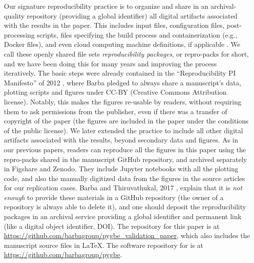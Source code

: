 Our signature reproducibility practice is to organize and share in an archival-quality repository (providing a global identifier) all digital artifacts associated with the results in the paper. 
This includes input files, configuration files, post-processing scripts, files specifying the build process and containerization (e.g., Docker files), and even cloud computing machine definitions, if applicable \cite{mesnard-barba2019}.
We call these openly shared file sets \emph{reproducibility packages}, or repro-packs for short, and we have been doing this for many years and improving the process iteratively. 
The basic steps were already contained in the ``Reproducibility PI Manifesto'' of 2012 \cite{barba2012manifesto}, where Barba pledged to always share a manuscript's data, plotting scripts and figures under CC-BY (Creative Commons Attribution license).
Notably, this makes the figures re-usable by readers, without requiring them to ask permissions from the publisher, even if there was a transfer of copyright of the paper (the figures are included in the paper under the conditions of the public license). 
We later extended the practice to include all other digital artifacts associated with the results, beyond secondary data and figures. 
As in our previous papers, readers can reproduce all the figures in this paper using the repro-packs shared in the manuscript GitHub repository, and archived separately in Figshare and Zenodo. 
They include Jupyter notebooks with all the plotting code, and also the manually digitized data from the figures in the source articles for our replication cases.
Barba and Thiruvathukal, 2017 \cite{BarbaThiruvathukal2017}, explain that it is \emph{not enough} to provide these materials in a GitHub repository (the owner of a repository is always able to delete it), and one should deposit the reproducibility packages in an archival service providing a global identifier and permanent link (like a digital object identifier, DOI).
The repository for this paper is at \url{https://github.com/barbagroup/pygbe_validation_paper}, which also includes the manuscript source files in LaTeX.
The software repository for \pygbe is at \url{https://github.com/barbagroup/pygbe}.


